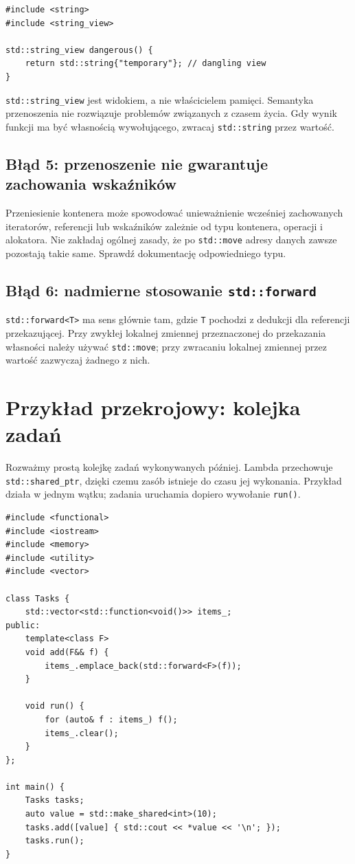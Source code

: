 \begin{lstlisting}
#include <string>
#include <string_view>

std::string_view dangerous() {
    return std::string{"temporary"}; // dangling view
}
\end{lstlisting}

\texttt{std::string\_view} jest widokiem, a nie właścicielem
pamięci. Semantyka przenoszenia nie rozwiązuje problemów
związanych z czasem życia. Gdy wynik funkcji ma być własnością
wywołującego, zwracaj \texttt{std::string} przez wartość.

\subsection{Błąd 5: przenoszenie nie gwarantuje zachowania wskaźników}

Przeniesienie kontenera może spowodować unieważnienie wcześniej
zachowanych iteratorów, referencji lub wskaźników zależnie od
typu kontenera, operacji i alokatora. Nie zakładaj ogólnej
zasady, że po \texttt{std::move} adresy danych zawsze pozostają
takie same. Sprawdź dokumentację odpowiedniego typu.

\subsection{Błąd 6: nadmierne stosowanie \texttt{std::forward}}

\texttt{std::forward<T>} ma sens głównie tam, gdzie \texttt{T}
pochodzi z dedukcji dla referencji przekazującej. Przy zwykłej
lokalnej zmiennej przeznaczonej do przekazania własności
należy używać \texttt{std::move}; przy zwracaniu lokalnej
zmiennej przez wartość zazwyczaj żadnego z nich.

\section{Przykład przekrojowy: kolejka zadań}
\label{sec:move-project}

Rozważmy prostą kolejkę zadań wykonywanych później.
Lambda przechowuje \texttt{std::shared\_ptr}, dzięki czemu zasób
istnieje do czasu jej wykonania. Przykład działa w jednym
wątku; zadania uruchamia dopiero wywołanie \texttt{run()}.

\begin{lstlisting}
#include <functional>
#include <iostream>
#include <memory>
#include <utility>
#include <vector>

class Tasks {
    std::vector<std::function<void()>> items_;
public:
    template<class F>
    void add(F&& f) {
        items_.emplace_back(std::forward<F>(f));
    }

    void run() {
        for (auto& f : items_) f();
        items_.clear();
    }
};

int main() {
    Tasks tasks;
    auto value = std::make_shared<int>(10);
    tasks.add([value] { std::cout << *value << '\n'; });
    tasks.run();
}
\end{lstlisting}

